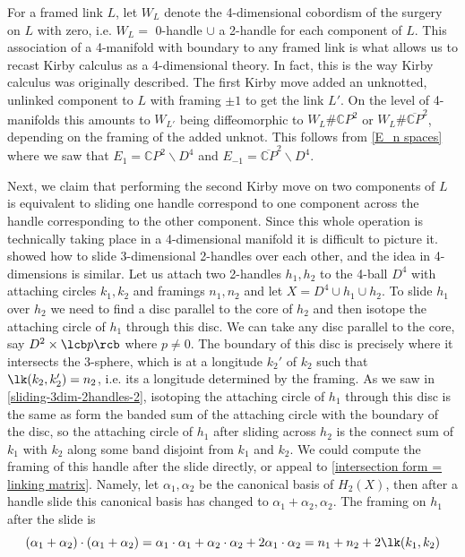 For a framed link $L$, let $W_L$ denote the 4-dimensional cobordism of the surgery on $L$ with zero, i.e. $W_L = $ 0-handle $\cup$ a 2-handle for each component of $L$. This association of a 4-manifold with boundary to any framed link is what allows us to recast Kirby calculus as a 4-dimensional theory. In fact, this is the way Kirby calculus was originally described. The first Kirby move added an unknotted, unlinked component to $L$ with framing $\pm 1$ to get the link $L'$. On the level of 4-manifolds this amounts to $W_{L'}$ being diffeomorphic to $W_L \# \mathbb CP^2$ or $W_L \# \overline{\mathbb CP}^2$, depending on the framing of the added unknot. This follows from \cref{E_n spaces} where we saw that $E_1 = \mathbb CP^2 \backslash D^4$ and $E_{-1} = \overline{\mathbb CP}^2 \backslash D^4$. 

Next, we claim that performing the second Kirby move on two components of $L$ is equivalent to sliding one handle correspond to one component across the handle corresponding to the other component. Since this whole operation is technically taking place in a 4-dimensional manifold it is difficult to picture it.  showed how to slide 3-dimensional 2-handles over each other, and the idea in 4-dimensions is similar. Let us attach two 2-handles $h_1,h_2$ to the 4-ball $D^4$ with attaching circles $k_1,k_2$ and framings $n_1,n_2$ and let $X=D^4\cup h_1\cup h_2$. To slide $h_1$ over $h_2$ we need to find a disc parallel to the core of $h_2$ and then isotope the attaching circle of $h_1$ through this disc. We can take any disc parallel to the core, say $D^2 \times \lcb p \rcb$ where $p \neq 0$. The boundary of this disc is precisely where it intersects the 3-sphere, which is at a longitude $k_2'$ of $k_2$ such that $\lk(k_2,k_2')=n_2$, i.e. its a longitude determined by the framing. As we saw in \cref{sliding-3dim-2handles-2}, isotoping the attaching circle of $h_1$ through this disc is the same as form the banded sum of the attaching circle with the boundary of the disc, so the attaching circle of $h_1$ after sliding across $h_2$ is the connect sum of $k_1$ with $k_2$ along some band disjoint from $k_1$ and $k_2$. We could compute the framing of this handle after the slide directly, or appeal to \cref{intersection form = linking matrix}. Namely, let $\alpha_1,\alpha_2$ be the canonical basis of $H_2(X)$, then after a handle slide this canonical basis has changed to $\alpha_1+\alpha_2,\alpha_2$. The framing on $h_1$ after the slide is
\[ (\alpha_1+\alpha_2)\cdot(\alpha_1+\alpha_2) = \alpha_1\cdot \alpha_1 + \alpha_2\cdot\alpha_2 + 2\alpha_1\cdot\alpha_2 = n_1 + n_2 + 2\lk(k_1,k_2) \]

